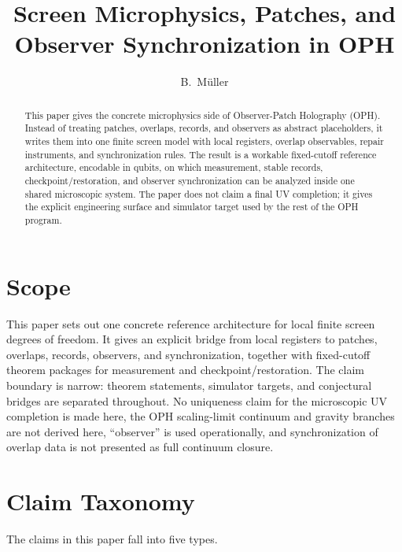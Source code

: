 \documentclass[11pt]{article}
\title{Screen Microphysics, Patches, and Observer Synchronization in OPH}
\author{B.\ M\"uller}
\date{\OPHPaperReleaseDate}
\begin{document}
\maketitle
\OPHPaperReleaseBanner

\begin{abstract}
This paper gives the concrete microphysics side of Observer-Patch Holography (OPH). Instead of treating patches, overlaps, records, and observers as abstract placeholders, it writes them into one finite screen model with local registers, overlap observables, repair instruments, and synchronization rules. The result is a workable fixed-cutoff reference architecture, encodable in qubits, on which measurement, stable records, checkpoint/restoration, and observer synchronization can be analyzed inside one shared microscopic system. The paper does not claim a final UV completion; it gives the explicit engineering surface and simulator target used by the rest of the OPH program.
\end{abstract}

\tableofcontents
\newpage

\section{Scope}

This paper sets out one concrete reference architecture for local finite screen degrees of
freedom. It gives an explicit bridge from local registers to patches, overlaps, records,
observers, and synchronization, together with fixed-cutoff theorem packages for measurement and
checkpoint/restoration. The claim boundary is narrow: theorem statements, simulator targets, and
conjectural bridges are separated throughout. No uniqueness claim for the microscopic UV
completion is made here, the OPH scaling-limit continuum and gravity branches are not derived
here, ``observer'' is used operationally, and synchronization of overlap data is not presented as
full continuum closure.

\section{Claim Taxonomy}

The claims in this paper fall into five types.
\end{document}
